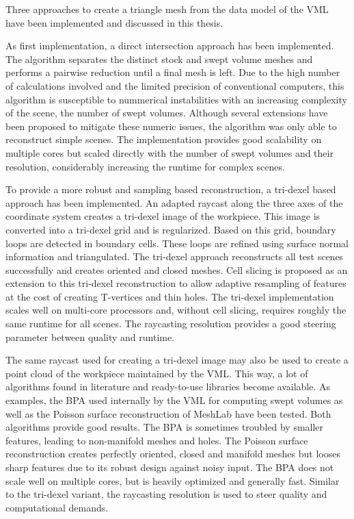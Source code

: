 Three approaches to create a triangle mesh from the data model of the VML have been implemented and discussed in this thesis.


As first implementation, a direct intersection approach has been implemented.
The algorithm separates the distinct stock and swept volume meshes and performs a pairwise reduction until a final mesh is left.
Due to the high number of calculations involved and the limited precision of conventional computers, this algorithm is susceptible to nummerical instabilities with an increasing complexity of the scene, \eg the number of swept volumes.
Although several extensions have been proposed to mitigate these numeric issues, the algorithm was only able to reconstruct simple scenes.
The implementation provides good scalability on multiple cores but scaled directly with the number of swept volumes and their resolution, considerably increasing the runtime for complex scenes.

To provide a more robust and sampling based reconstruction, a tri-dexel based approach has been implemented.
An adapted raycast along the three axes of the coordinate system creates a tri-dexel image of the workpiece.
This image is converted into a tri-dexel grid and is regularized.
Based on this grid, boundary loops are detected in boundary cells.
These loops are refined using surface normal information and triangulated.
The tri-dexel approach reconstructs all test scenes successfully and creates oriented and closed meshes.
Cell slicing is proposed as an extension to this tri-dexel reconstruction to allow adaptive resampling of features at the cost of creating T-vertices and thin holes.
The tri-dexel implementation scales well on multi-core processors and, without cell slicing, requires roughly the same runtime for all scenes.
The raycasting resolution provides a good steering parameter between quality and runtime.

The same raycast used for creating a tri-dexel image may also be used to create a point cloud of the workpiece maintained by the VML.
This way, a lot of algorithms found in literature and ready-to-use libraries become available.
As examples, the BPA used internally by the VML for computing swept volumes as well as the Poisson surface reconstruction of MeshLab have been tested.
Both algorithms provide good results.
The BPA is sometimes troubled by smaller features, leading to non-manifold meshes and holes.
The Poisson surface reconstruction creates perfectly oriented, closed and manifold meshes but looses sharp features due to its robust design against noisy input.
The BPA does not scale well on multiple cores, but is heavily optimized and generally fast.
Similar to the tri-dexel variant, the raycasting resolution is used to steer quality and computational demands.



